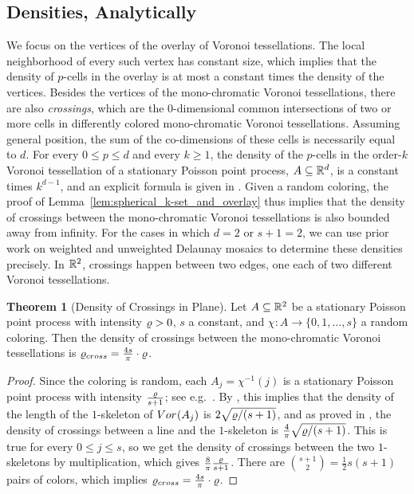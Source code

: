 \documentclass[a4paper]{article}
\newcommand {\mm}[1]   {\ifmmode{#1}\else{\mbox{\(#1\)}}\fi}
\newcommand{\Rspace}        {\mm{{\mathbb R}}}
\newcommand{\Voronoi}[2]    {\mm{{\rm Vor}_{#1}{({#2})}}}
\newcommand{\Crossings}     {\mm{\varrho_{\rm cross}}}
\newcommand{\intensity}     {\mm{\varrho}}
\theoremstyle{definition}
\newtheorem{theorem}{Theorem}
\numberwithin{theorem}{section}
\numberwithin{equation}{section}
\begin{document}
\subsection{Densities, Analytically}
\label{sec:5.1}

We focus on the vertices of the overlay of Voronoi tessellations.
The local neighborhood of every such vertex has constant size, which implies that the density of $p$-cells in the overlay is at most a constant times the density of the vertices.
Besides the vertices of the mono-chromatic Voronoi tessellations, there are also \emph{crossings}, which are the $0$-dimensional common intersections of two or more cells in differently colored mono-chromatic Voronoi tessellations.
Assuming general position, the sum of the co-dimensions of these cells is necessarily equal to $d$.
For every $0 \leq p \leq d$ and every $k \geq 1$, the density of the $p$-cells in the order-$k$ Voronoi tessellation of a stationary Poisson point process, $A \subseteq \Rspace^d$, is a constant times $k^{d-1}$, and an explicit formula is given in \cite[Theorem 1.2]{EdNi19B}.
Given a random coloring, the proof of  Lemma~\ref{lem:spherical_k-set_and_overlay} thus implies that the density of crossings between the mono-chromatic Voronoi tessellations is also bounded away from infinity.
For the cases in which $d=2$ or $s+1 = 2$, we can use prior work on weighted and unweighted Delaunay mosaics \cite{EdNi19A,EdNi19B} to determine these densities precisely.
In $\Rspace^2$, crossings happen between two edges, one each of two different Voronoi tessellations.
\begin{theorem}[Density of Crossings in Plane]
  \label{thm:density_of_crossings_in_plane}
  Let $A \subseteq \Rspace^2$ be a stationary Poisson point process with intensity $\intensity > 0$, $s$ a constant, and $\chi \colon A \to \{0,1,\ldots,s\}$ a random coloring.
  Then the density of crossings between the mono-chromatic Voronoi tessellations is $\Crossings = \frac{4s}{\pi} \cdot \intensity$.
\end{theorem}
\begin{proof}
  Since the coloring is random, each $A_j = \chi^{-1} (j)$ is a stationary Poisson point process with intensity $\frac{\intensity}{s+1}$; see e.g.\ \cite[Chapter 11]{Pis14}.
  By \cite[Theorem 1.1]{EdNi19B}, this implies that the density of the length of the $1$-skeleton of $\Voronoi{}{A_j}$ is $2 \sqrt{\intensity/(s+1)}$, and as proved in \cite{EdNi19A}, the density of crossings between a line and the $1$-skeleton is $\frac{4}{\pi} \sqrt{\intensity/(s+1)}$.
  This is true for every $0 \leq j \leq s$, so we get the density of crossings between the two $1$-skeletons by multiplication, which gives $\frac{8}{\pi} \frac{\intensity}{s+1}$.
  There are $\binom{s+1}{2} = \frac{1}{2} s (s+1)$ pairs of colors, which implies $\Crossings = \frac{4s}{\pi} \cdot \intensity$.
\end{proof}
\end{document}

